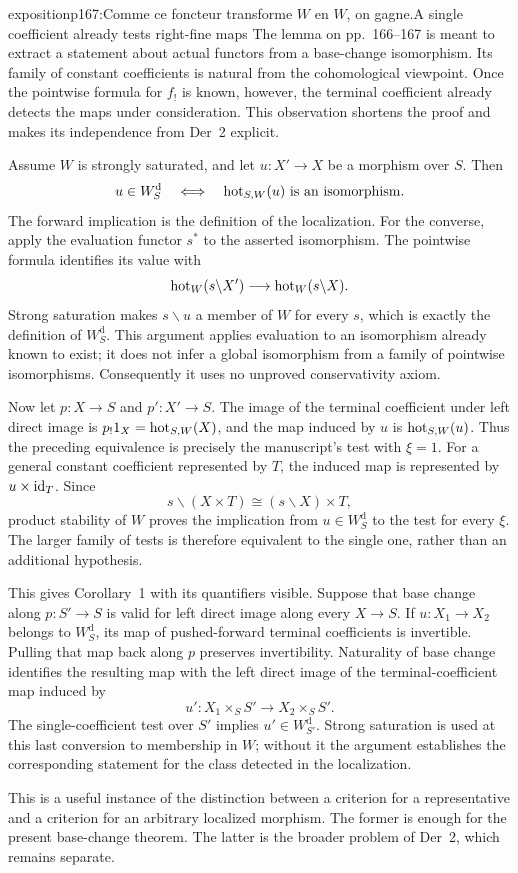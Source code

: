 \begin{dcomment}{exposition}{p167:Comme ce foncteur transforme $W$ en $W$, on gagne.}{A single coefficient already tests right-fine maps}
The lemma on pp.~166--167 is meant to extract a statement about actual functors from a base-change isomorphism. Its family of constant coefficients is natural from the cohomological viewpoint. Once the pointwise formula for $f_!$ is known, however, the terminal coefficient already detects the maps under consideration. This observation shortens the proof and makes its independence from Der~2 explicit.

Assume $W$ is strongly saturated, and let $u:X'\to X$ be a morphism over $S$. Then
\[
 u\in W_S^{\mathrm d}
 \quad\Longleftrightarrow\quad
 \mathrm{hot}_{S,W}(u)\text{ is an isomorphism}.
\]
The forward implication is the definition of the localization. For the converse, apply the evaluation functor $s^*$ to the asserted isomorphism. The pointwise formula identifies its value with
\[
 \mathrm{hot}_W(s\backslash X')\longrightarrow\mathrm{hot}_W(s\backslash X).
\]
Strong saturation makes $s\backslash u$ a member of $W$ for every $s$, which is exactly the definition of $W_S^{\mathrm d}$. This argument applies evaluation to an isomorphism already known to exist; it does not infer a global isomorphism from a family of pointwise isomorphisms. Consequently it uses no unproved conservativity axiom.

Now let $p:X\to S$ and $p':X'\to S$. The image of the terminal coefficient under left direct image is $p_!1_X=\mathrm{hot}_{S,W}(X)$, and the map induced by $u$ is $\mathrm{hot}_{S,W}(u)$. Thus the preceding equivalence is precisely the manuscript's test with $\xi=1$. For a general constant coefficient represented by $T$, the induced map is represented by $u\times\mathrm{id}_T$. Since
\[
 s\backslash(X\times T)\cong(s\backslash X)\times T,
\]
product stability of $W$ proves the implication from $u\in W_S^{\mathrm d}$ to the test for every $\xi$. The larger family of tests is therefore equivalent to the single one, rather than an additional hypothesis.

This gives Corollary~1 with its quantifiers visible. Suppose that base change along $p:S'\to S$ is valid for left direct image along every $X\to S$. If $u:X_1\to X_2$ belongs to $W_S^{\mathrm d}$, its map of pushed-forward terminal coefficients is invertible. Pulling that map back along $p$ preserves invertibility. Naturality of base change identifies the resulting map with the left direct image of the terminal-coefficient map induced by
\[
 u':X_1\times_S S'\longrightarrow X_2\times_S S'.
\]
The single-coefficient test over $S'$ implies $u'\in W_{S'}^{\mathrm d}$. Strong saturation is used at this last conversion to membership in $W$; without it the argument establishes the corresponding statement for the class detected in the localization.

This is a useful instance of the distinction between a criterion for a representative and a criterion for an arbitrary localized morphism. The former is enough for the present base-change theorem. The latter is the broader problem of Der~2, which remains separate.
\end{dcomment}


